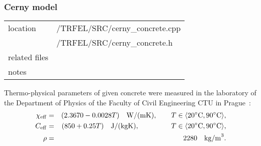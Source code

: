\subsubsection{Cerny model}

\begin{center}
\begin{tabular}{|l|l|}
\hline
location & /TRFEL/SRC/cerny\_concrete.cpp\\
         & /TRFEL/SRC/cerny\_concrete.h
\\ \hline
related files &
\\ \hline
notes & 
\\ \hline
\end{tabular}
\end{center}


Thermo-physical parameters of given concrete were measured in the laboratory 
of the Department of Physics of the Faculty of Civil Engineering CTU in Prague~\cite{cerny}:
\begin{eqnarray}
\chi_{\rm eff} &=& (2.3670 - 0.0028 T) \quad {\rm W/(m K)}, \qquad T \in \langle 20^{\circ}{\rm C}, 
90^{\circ}{\rm C}\rangle, \\
C_{\rm eff} &=& (850 + 0.25 T) \quad {\rm J/(kg K)}, \qquad \qquad \;\; T\in \langle 20^{\circ}{\rm C}, 
90^{\circ}{\rm C}\rangle, \\
\rho &=& 2280 \quad {\rm kg/m}^3.\nonumber
\end{eqnarray}
